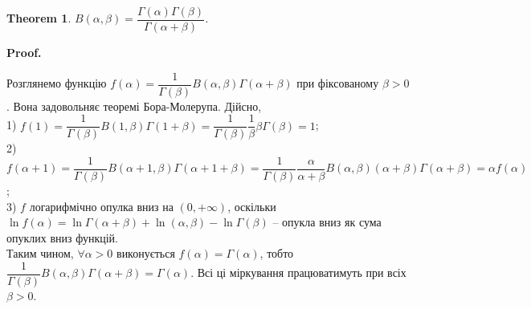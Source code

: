 \documentclass[a4paper, 10pt]{article}
\makeatletter
\def\huge{\displaystyle}
\def\qed{$\blacksquare$}
\theoremstyle{theoremdd}
\newtheorem{theorem}{Theorem}[subsection]
\theoremstyle{theoremdd}
\theoremstyle{theoremdd}
\theoremstyle{theoremdd}
\theoremstyle{theoremdd}
\theoremstyle{theoremdd}
\theoremstyle{theoremdd}
\theoremstyle{theoremdd}
\theoremstyle{theoremdd}
\renewenvironment{proof}[1][Proof.\\]{\par
\pushQED{\hfill \qed}%
\normalfont \topsep6\p@\@plus6\p@\relax
\trivlist
\item\relax
{\bfseries
#1\@addpunct{.}}\hspace\labelsep\ignorespaces
}{%
\popQED\endtrivlist\@endpefalse
}
\makeatother
\begin{document}
\iffalse
\begin{proof}
Використовучи \textbf{Prp 3.8.1.} (TODO: лінкування) отримаємо:\\
$\Gamma(\alpha) \Gamma(1-\alpha) = \huge \lim_{n \to \infty} n^{\alpha} \dfrac{(n-1)!}{\alpha(\alpha+1)\dots (\alpha+n-1)} \lim_{n \to \infty} n^{1-\alpha} \dfrac{(n-1)!}{(1-\alpha)(2-\alpha)\dots (n-\alpha)} = \\
= \lim_{n \to \infty} \dfrac{n}{n-\alpha} \dfrac{1}{\alpha \left( 1 + \dfrac{\alpha}{1} \right) \left( 1 + \dfrac{\alpha}{2} \right) \dots \left( 1 + \dfrac{\alpha}{n-1} \right)} \dfrac{1}{\left( 1 - \dfrac{\alpha}{1} \right) \left( 1 - \dfrac{\alpha}{2} \right) \dots \left( 1 - \dfrac{\alpha}{n-1} \right)} = \\
= \dfrac{1}{\alpha} \lim_{n \to \infty} \dfrac{1}{\left( 1 - \dfrac{\alpha^2}{1^2} \right)\left( 1 - \dfrac{\alpha^2}{2^2} \right) \dots \left( 1 - \dfrac{\alpha^2}{(n-1)^2} \right)}$\\
В теорії рядів Фур'є (колись згодом) ми одержимо формулу:\\
$\sin (\pi \alpha) = \pi \alpha \huge\lim_{n \to \infty} \left( 1 - \dfrac{\alpha^2}{1^2} \right)\left( 1 - \dfrac{\alpha^2}{2^2} \right) \dots \left( 1 - \dfrac{\alpha^2}{(n-1)^2} \right) \overset{\text{або}}{=} \pi \alpha \prod_{n=1}^\infty \left( 1 - \dfrac{\alpha^2}{n^2} \right)$.\\
Власне звідси отримаємо $\Gamma(\alpha)\Gamma(1-\alpha) = \dfrac{\pi}{\sin \pi \alpha}$.
\bigskip \\
Друга формула вказівка: заміна $\beta = \alpha + \dfrac{1}{2}$.
\end{proof}
\fi

\begin{theorem}
$B(\alpha,\beta) = \dfrac{\Gamma(\alpha) \Gamma(\beta)}{\Gamma(\alpha+\beta)}$.
\end{theorem}

\begin{proof}
Розглянемо функцію $f(\alpha) = \dfrac{1}{\Gamma(\beta)} B(\alpha,\beta) \Gamma(\alpha+\beta)$ при фіксованому $\beta > 0$. Вона задовольняє теоремі Бора-Молерупа. Дійсно,\\
1) $f(1) = \dfrac{1}{\Gamma(\beta)} B(1,\beta) \Gamma(1+\beta) = \dfrac{1}{\Gamma(\beta)} \dfrac{1}{\beta} \beta \Gamma(\beta) = 1$;\\
2) $f(\alpha+1) = \dfrac{1}{\Gamma(\beta)} B(\alpha+1,\beta) \Gamma(\alpha+1+\beta) = \dfrac{1}{\Gamma(\beta)} \dfrac{\alpha}{\alpha+\beta} B(\alpha,\beta) (\alpha+\beta) \Gamma(\alpha+\beta) = \alpha f(\alpha)$;\\
3) $f$ логарифмічно опулка вниз на $(0,+\infty)$, оскільки $\ln f(\alpha) = \ln \Gamma(\alpha+\beta) + \ln(\alpha,\beta) - \ln \Gamma(\beta)$ -- опукла вниз як сума опуклих вниз функцій.\\
Таким чином, $\forall \alpha >0$ виконується $f(\alpha) = \Gamma(\alpha)$, тобто $\dfrac{1}{\Gamma(\beta)} B(\alpha,\beta) \Gamma(\alpha+\beta) = \Gamma(\alpha)$. Всі ці міркування працюватимуть при всіх $\beta > 0$.
\end{proof}
\end{document}

